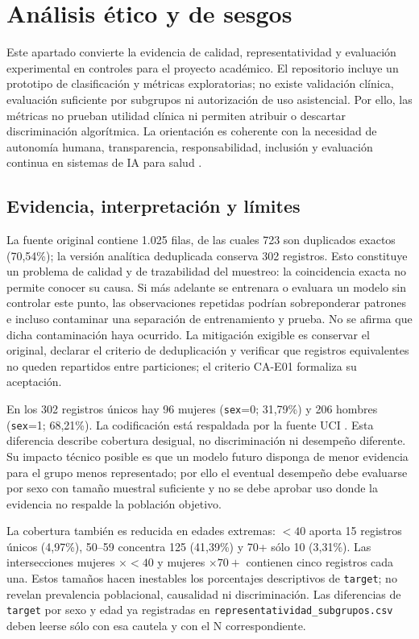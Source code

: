 \section{Análisis ético y de sesgos}\label{sec:etica-sesgos}

Este apartado convierte la evidencia de calidad, representatividad y evaluación experimental en controles para el proyecto académico. El repositorio incluye un prototipo de clasificación y métricas exploratorias; no existe validación clínica, evaluación suficiente por subgrupos ni autorización de uso asistencial. Por ello, las métricas no prueban utilidad clínica ni permiten atribuir o descartar discriminación algorítmica. La orientación es coherente con la necesidad de autonomía humana, transparencia, responsabilidad, inclusión y evaluación continua en sistemas de IA para salud \parencite{who-ai-health,fda-transparency-mlmd}.

\subsection{Evidencia, interpretación y límites}

La fuente original contiene 1.025 filas, de las cuales 723 son duplicados exactos (70,54\%); la versión analítica deduplicada conserva 302 registros. Esto constituye un problema de calidad y de trazabilidad del muestreo: la coincidencia exacta no permite conocer su causa. Si más adelante se entrenara o evaluara un modelo sin controlar este punto, las observaciones repetidas podrían sobreponderar patrones e incluso contaminar una separación de entrenamiento y prueba. No se afirma que dicha contaminación haya ocurrido. La mitigación exigible es conservar el original, declarar el criterio de deduplicación y verificar que registros equivalentes no queden repartidos entre particiones; el criterio CA-E01 formaliza su aceptación.

En los 302 registros únicos hay 96 mujeres (\texttt{sex}=0; 31,79\%) y 206 hombres (\texttt{sex}=1; 68,21\%). La codificación está respaldada por la fuente UCI \parencite{uci-heart-disease}. Esta diferencia describe cobertura desigual, no discriminación ni desempeño diferente. Su impacto técnico posible es que un modelo futuro disponga de menor evidencia para el grupo menos representado; por ello el eventual desempeño debe evaluarse por sexo con tamaño muestral suficiente y no se debe aprobar uso donde la evidencia no respalde la población objetivo.

La cobertura también es reducida en edades extremas: $<40$ aporta 15 registros únicos (4,97\%), 50--59 concentra 125 (41,39\%) y 70+ sólo 10 (3,31\%). Las intersecciones mujeres $\times <40$ y mujeres $\times 70+$ contienen cinco registros cada una. Estos tamaños hacen inestables los porcentajes descriptivos de \texttt{target}; no revelan prevalencia poblacional, causalidad ni discriminación. Las diferencias de \texttt{target} por sexo y edad ya registradas en \texttt{representatividad\_subgrupos.csv} deben leerse sólo con esa cautela y con el N correspondiente.

